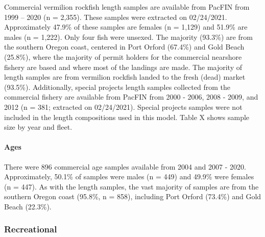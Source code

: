 \documentclass[11pt,
  english,
  a4paper,
]{article}
\begin{document}
Commercial vermilion rockfish length samples are available from PacFIN from 1999 -- 2020 (n = 2,355). These samples were extracted on 02/24/2021. Approximately 47.9\% of these samples are females (n = 1,129) and 51.9\% are males (n = 1,222). Only four fish were unsexed. The majority (93.3\%) are from the southern Oregon coast, centered in Port Orford (67.4\%) and Gold Beach (25.8\%), where the majority of permit holders for the commercial nearshore fishery are based and where most of the landings are made. The majority of length samples are from vermilion rockfish landed to the fresh (dead) market (93.5\%). Additionally, special projects length samples collected from the commercial fishery are available from PacFIN from 2000 - 2006, 2008 - 2009, and 2012 (n = 381; extracted on 02/24/2021). Special projects samples were not included in the length compositions used in this model. Table X shows sample size by year and fleet.

\leavevmode\tagmcend\tagstructend\par


\hypertarget{ages}{%
\paragraph{Ages}\label{ages}}

\leavevmode\tagmcend\tagstructend


There were 896 commercial age samples available from 2004 and 2007 - 2020. Approximately, 50.1\% of samples were males (n = 449) and 49.9\% were females (n = 447). As with the length samples, the vast majority of samples are from the southern Oregon coast (95.8\%, n = 858), including Port Orford (73.4\%) and Gold Beach (22.3\%).

\leavevmode\tagmcend\tagstructend\par


\hypertarget{recreational}{%
\subsubsection{Recreational}\label{recreational}}

\leavevmode\tagmcend\tagstructend

\end{document}
